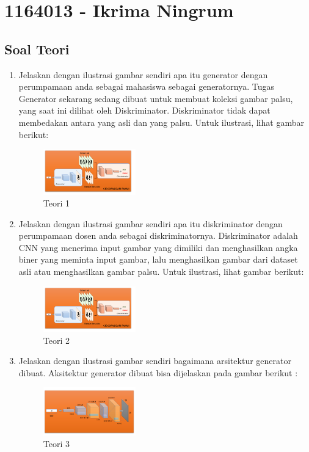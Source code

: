 \section{1164013 - Ikrima Ningrum}
\subsection{Soal Teori}
\begin{enumerate}
    \item Jelaskan dengan ilustrasi gambar sendiri apa itu generator dengan perumpamaan anda sebagai mahasiswa sebagai generatornya.
    \hfill\break
    Tugas Generator sekarang sedang dibuat untuk membuat koleksi gambar palsu, yang saat ini dilihat oleh Diskriminator. Diskriminator tidak dapat membedakan antara yang asli dan yang palsu. Untuk ilustrasi, lihat gambar berikut: 
    \begin{figure}[H]
		\includegraphics[width=4cm]{figures/1164013/8/teori1,2.png}
		\centering
		\caption{Teori 1}
    \end{figure}

    \item Jelaskan dengan ilustrasi gambar sendiri apa itu diskriminator dengan perumpamaan dosen anda sebagai diskriminatornya.
    \hfill\break
    Diskriminator adalah CNN yang menerima input gambar yang dimiliki dan menghasilkan angka biner yang meminta input gambar, lalu menghasilkan gambar dari dataset asli atau menghasilkan gambar palsu. Untuk ilustrasi, lihat gambar berikut: 
    \begin{figure}[H]
		\includegraphics[width=4cm]{figures/1164013/8/teori1,2.png}
		\centering
		\caption{Teori 2}
    \end{figure}

    \item Jelaskan dengan ilustrasi gambar sendiri bagaimana arsitektur generator dibuat.
	\hfill\break
    Aksitektur generator dibuat bisa dijelaskan pada gambar berikut :
    \begin{figure}[H]
		\includegraphics[width=4cm]{figures/1164013/8/teori3.png}
		\centering
		\caption{Teori 3}
    \end{figure}


\end{enumerate}
